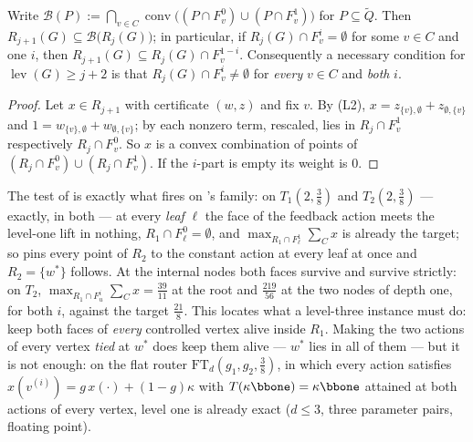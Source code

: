 \begin{lemma}\label{xc:balas-iter}
Write $\mathcal B(P):=\bigcap_{v\in C}\operatorname{conv}\bigl((P\cap F^{0}_{v})\cup
(P\cap F^{1}_{v})\bigr)$ for $P\subseteq\widetilde Q$.  Then
$R_{j+1}(G)\subseteq\mathcal B\bigl(R_j(G)\bigr)$; in particular, if
$R_j(G)\cap F^{i}_{v}=\emptyset$ for some $v\in C$ and one $i$, then
$R_{j+1}(G)\subseteq R_j(G)\cap F^{1-i}_{v}$.  Consequently a necessary condition for
$\operatorname{lev}(G)\ge j+2$ is that $R_j(G)\cap F^{i}_{v}\ne\emptyset$ for \emph{every}
$v\in C$ and \emph{both} $i$.
\end{lemma}

\begin{proof}
Let $x\in R_{j+1}$ with certificate $(w,z)$ and fix $v$.  By (L2),
$x=z_{\{v\},\emptyset}+z_{\emptyset,\{v\}}$ and $1=w_{\{v\},\emptyset}+w_{\emptyset,\{v\}}$;
by  each nonzero term, rescaled, lies in $R_{j}\cap F^{1}_{v}$
respectively $R_{j}\cap F^{0}_{v}$.  So $x$ is a convex combination of points of
$(R_j\cap F^{0}_{v})\cup(R_j\cap F^{1}_{v})$.  If the $i$-part is empty its weight is $0$.
\end{proof}

\begin{remark}\label{xc:why-two}
The test of  is exactly what fires on 's family: on
$T_1(2,\tfrac38)$ and $T_2(2,\tfrac38)$ --- exactly, in both --- at every \emph{leaf} $\ell$ the
face of the feedback action meets the level-one lift in nothing,
$R_1\cap F^{0}_{\ell}=\emptyset$, and $\max_{R_1\cap F^{1}_{\ell}}\sum_Cx$ is already the
target; so  pins every point of $R_2$ to the constant action at every leaf
at once and $R_2=\{w^{\ast}\}$ follows.  At the internal nodes both faces survive and survive
strictly: on $T_2$, $\max_{R_1\cap F^{i}_{u}}\sum_Cx=\tfrac{39}{11}$ at the root and
$\tfrac{219}{56}$ at the two nodes of depth one, for both $i$, against the target $\tfrac{21}8$.
This locates what a level-three instance must do: keep both faces of \emph{every} controlled
vertex alive inside $R_1$.  Making the two actions of every vertex \emph{tied} at $w^{\ast}$
does keep them alive --- $w^{\ast}$ lies in all of them --- but it is not enough: on the flat
router $\mathrm{FT}_d(g_1,g_2,\tfrac38)$, in which every action satisfies
$x(v^{(i)})=g\,x(\cdot)+(1-g)\kappa$ with $T(\kappa\bbone)=\kappa\bbone$ attained at both
actions of every vertex, level one is already exact ($d\le3$, three parameter pairs,
floating point).
\end{remark}

